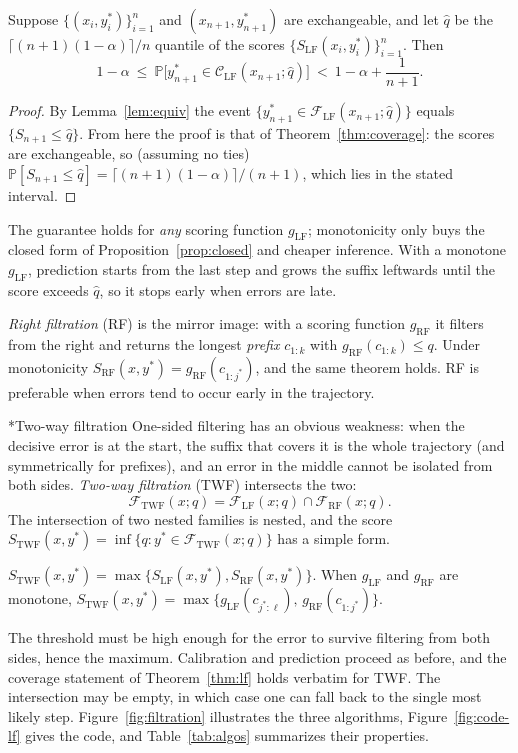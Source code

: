 \documentclass[11pt]{article}
\makeatletter
\theoremstyle{definition}
\renewcommand\subsection{\@startsection{subsection}{2}{\z@}{-3.25ex\@plus -1ex \@minus -.2ex}{1.5ex \@plus .2ex}{\normalfont\large\bfseries\color{secblue}}}
\newcommand{\C}{\mathcal{C}}
\newcommand{\F}{\mathcal{F}}
\newcommand{\qhat}{\hat{q}}
\newcommand{\PP}{\mathbb{P}}
\newcommand{\LF}{\mathrm{LF}}
\newcommand{\RF}{\mathrm{RF}}
\newcommand{\TWF}{\mathrm{TWF}}
\newcommand{\ystar}{y^*}
\newcommand{\jstar}{j^*}
\makeatother
\begin{document}
\begin{theorem}\label{thm:lf}
Suppose $\{(x_i,\ystar_i)\}_{i=1}^n$ and $(x_{n+1},\ystar_{n+1})$ are exchangeable, and let $\qhat$ be the $\lceil(n+1)(1-\alpha)\rceil/n$ quantile of the scores $\{S_\LF(x_i,\ystar_i)\}_{i=1}^n$. Then
\[1-\alpha\ \le\ \PP\big[\ystar_{n+1}\in\C_\LF(x_{n+1};\qhat)\big]\ <\ 1-\alpha+\frac{1}{n+1}.\]
\end{theorem}
\begin{proof}
By Lemma~\ref{lem:equiv} the event $\{\ystar_{n+1}\in\F_\LF(x_{n+1};\qhat)\}$ equals $\{S_{n+1}\le\qhat\}$. From here the proof is that of Theorem~\ref{thm:coverage}: the scores are exchangeable, so (assuming no ties) $\PP[S_{n+1}\le\qhat]=\lceil(n+1)(1-\alpha)\rceil/(n+1)$, which lies in the stated interval.
\end{proof}
The guarantee holds for \emph{any} scoring function $g_\LF$; monotonicity only buys the closed form of Proposition~\ref{prop:closed} and cheaper inference. With a monotone $g_\LF$, prediction starts from the last step and grows the suffix leftwards until the score exceeds $\qhat$, so it stops early when errors are late.

\emph{Right filtration} (RF) is the mirror image: with a scoring function $g_\RF$ it filters from the right and returns the longest \emph{prefix} $c_{1:k}$ with $g_\RF(c_{1:k})\le q$. Under monotonicity $S_\RF(x,\ystar)=g_\RF(c_{1:\jstar})$, and the same theorem holds. RF is preferable when errors tend to occur early in the trajectory.

\subsection*{Two-way filtration}
One-sided filtering has an obvious weakness: when the decisive error is at the start, the suffix that covers it is the whole trajectory (and symmetrically for prefixes), and an error in the middle cannot be isolated from both sides. \emph{Two-way filtration} (TWF) intersects the two:
\begin{equation}\label{eq:FTWF}
\F_\TWF(x;q)=\F_\LF(x;q)\cap\F_\RF(x;q).
\end{equation}
The intersection of two nested families is nested, and the score $S_\TWF(x,\ystar)=\inf\{q:\ystar\in\F_\TWF(x;q)\}$ has a simple form.
\begin{proposition}\label{prop:twf}
$S_\TWF(x,\ystar)=\max\{S_\LF(x,\ystar),S_\RF(x,\ystar)\}$. When $g_\LF$ and $g_\RF$ are monotone, $S_\TWF(x,\ystar)=\max\{g_\LF(c_{\jstar:\ell}),\,g_\RF(c_{1:\jstar})\}$.
\end{proposition}
\noindent The threshold must be high enough for the error to survive filtering from both sides, hence the maximum. Calibration and prediction proceed as before, and the coverage statement of Theorem~\ref{thm:lf} holds verbatim for TWF. The intersection may be empty, in which case one can fall back to the single most likely step. Figure~\ref{fig:filtration} illustrates the three algorithms, Figure~\ref{fig:code-lf} gives the code, and Table~\ref{tab:algos} summarizes their properties.
\end{document}
